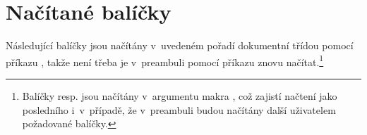 
\chapter{Načítané balíčky}\label{packages}%

Následující balíčky jsou načítány v~uvedeném pořadí dokumentní třídou
 pomocí příkazu , takže
není třeba je v~preambuli pomocí příkazu  znovu
načítat.\footnote{Balíčky  resp.  jsou načítány
  v~argumentu makra \protect{}, což zajistí
  načtení  jako posledního i~v~případě, že v~preambuli budou
  načítány další uživatelem požadované balíčky.}

